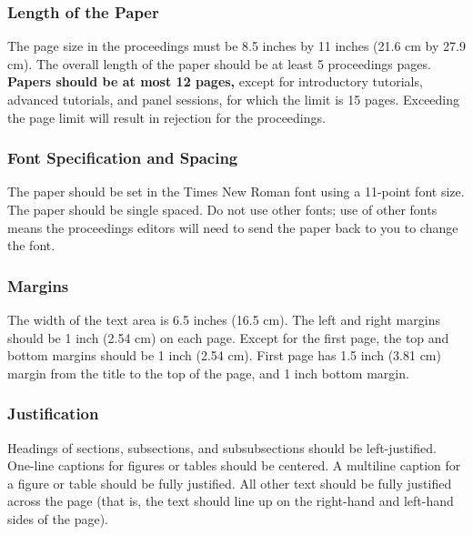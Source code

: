 \documentclass{wscpaperproc}
\theoremstyle{wsc}
\begin{document}
\subsubsection{Length of the Paper}
The page size in the proceedings must be 8.5 inches by 11 inches (21.6 cm by 27.9 cm). The overall length of the paper should be at least 5 proceedings pages. \textbf{Papers should be at most 12 pages,} except for introductory tutorials, advanced tutorials, and panel sessions, for which the limit is 15 pages. Exceeding the page limit will result in rejection for the proceedings.

\subsubsection{Font Specification and Spacing}
The paper should be set in the Times New Roman font using a 11-point font size. The paper should be single spaced. Do not use other fonts; use of other fonts means the proceedings editors will need to send the paper back to you to change the font.

\subsubsection{Margins}
\label{sec:margins}
The width of the text area is 6.5 inches (16.5 cm). The left and right margins should be 1 inch (2.54 cm) on each page. Except for the first page, the top and bottom margins should be 1 inch (2.54 cm). First page has 1.5 inch (3.81 cm) margin from the title to the top of the page, and 1 inch bottom margin. %

\subsubsection{Justification}
Headings of sections, subsections, and subsubsections should be left-justified. One-line captions for figures or tables should be centered. A multiline caption for a figure or table should be fully justified. All other text should be fully justified across the page (that is, the text should line up on the right-hand and left-hand sides of the page).
\end{document}
